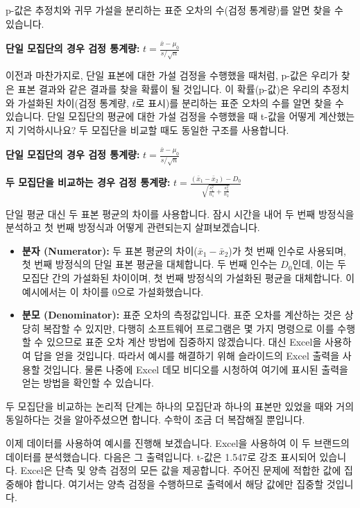 \documentclass[11pt,a4paper]{book}
\theoremstyle{definition}
\begin{document}
\begin{infobox}[title=두 브랜드 비교 (5/8): 3단계 - p-값 계산 (기본 원리)]
p-값은 추정치와 귀무 가설을 분리하는 표준 오차의 수(검정 통계량)를 알면 찾을 수 있습니다.

\textbf{단일 모집단의 경우 검정 통계량:}
$t = \frac{\bar{x} - \mu_0}{s/\sqrt{n}}$

이전과 마찬가지로, 단일 표본에 대한 가설 검정을 수행했을 때처럼, p-값은 우리가 찾은 표본 결과와 같은 결과를 찾을 확률이 될 것입니다. 이 확률(p-값)은 우리의 추정치와 가설화된 차이(검정 통계량, $t$로 표시)를 분리하는 표준 오차의 수를 알면 찾을 수 있습니다.
단일 모집단의 평균에 대한 가설 검정을 수행했을 때 t-값을 어떻게 계산했는지 기억하시나요? 두 모집단을 비교할 때도 동일한 구조를 사용합니다.
\end{infobox}

\begin{infobox}[title=두 브랜드 비교 (6/8): 3단계 - p-값 계산 (두 모집단)]
\textbf{단일 모집단의 경우 검정 통계량:}
$t = \frac{\bar{x} - \mu_0}{s/\sqrt{n}}$

\textbf{두 모집단을 비교하는 경우 검정 통계량:}
$t = \frac{(\bar{x}_1 - \bar{x}_2) - D_0}{\sqrt{\frac{s_1^2}{n_1} + \frac{s_2^2}{n_2}}}$

단일 평균 대신 두 표본 평균의 차이를 사용합니다. 잠시 시간을 내어 두 번째 방정식을 분석하고 첫 번째 방정식과 어떻게 관련되는지 살펴보겠습니다.
\begin{itemize}
    \item \textbf{분자 (Numerator):} 두 표본 평균의 차이($\bar{x}_1 - \bar{x}_2$)가 첫 번째 인수로 사용되며, 첫 번째 방정식의 단일 표본 평균을 대체합니다. 두 번째 인수는 $D_0$인데, 이는 두 모집단 간의 가설화된 차이이며, 첫 번째 방정식의 가설화된 평균을 대체합니다. 이 예시에서는 이 차이를 0으로 가설화했습니다.
    \item \textbf{분모 (Denominator):} 표준 오차의 측정값입니다. 표준 오차를 계산하는 것은 상당히 복잡할 수 있지만, 다행히 소프트웨어 프로그램은 몇 가지 명령으로 이를 수행할 수 있으므로 표준 오차 계산 방법에 집중하지 않겠습니다. 대신 Excel을 사용하여 답을 얻을 것입니다. 따라서 예시를 해결하기 위해 슬라이드의 Excel 출력을 사용할 것입니다. 물론 나중에 Excel 데모 비디오를 시청하여 여기에 표시된 출력을 얻는 방법을 확인할 수 있습니다.
\end{itemize}
두 모집단을 비교하는 논리적 단계는 하나의 모집단과 하나의 표본만 있었을 때와 거의 동일하다는 것을 알아주셨으면 합니다. 수학이 조금 더 복잡해질 뿐입니다.

이제 데이터를 사용하여 예시를 진행해 보겠습니다. Excel을 사용하여 이 두 브랜드의 데이터를 분석했습니다. 다음은 그 출력입니다. t-값은 1.547로 강조 표시되어 있습니다. Excel은 단측 및 양측 검정의 모든 값을 제공합니다. 주어진 문제에 적합한 값에 집중해야 합니다. 여기서는 양측 검정을 수행하므로 출력에서 해당 값에만 집중할 것입니다.


\end{infobox}
\end{document}
